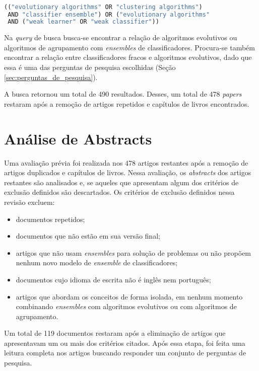 \documentclass[12pt]{report}
\begin{document}
\begin{lstlisting}[language=Python]

(("evolutionary algorithms" OR "clustering algorithms")
 AND "classifier ensemble") OR ("evolutionary algorithms"
 AND ("weak learner" OR "weak classifier"))

\end{lstlisting}

\bigbreak

Na \textit{query} de busca busca-se encontrar a relação de algoritmos evolutivos ou algoritmos de agrupamento com \textit{ensembles} de classificadores. Procura-se também encontrar a relação entre classificadores fracos e algoritmos evolutivos, dado que essa é uma das perguntas de pesquisa escolhidas (Seção \ref{sec:perguntas_de_pesquisa}).

A busca retornou um total de 490 resultados. Desses, um total de 478 \textit{papers} restaram após a remoção de artigos repetidos e capítulos de livros encontrados.  

\section{Análise de Abstracts} \label{sec:analise_de_abstracts}

Uma avaliação prévia foi realizada nos 478 artigos restantes após a remoção de artigos duplicados e capítulos de livros. Nessa avaliação, os \textit{abstracts} dos artigos restantes são analisados e, se aqueles que apresentam algum dos critérios de exclusão definidos são descartados. Os critérios de exclusão definidos nessa revisão excluem:

\begin{itemize}
    \item documentos repetidos;
    \item documentos que não estão em sua versão final;
    \item artigos que não usam \textit{ensembles} para solução de problemas ou não propõem nenhum novo modelo de \textit{ensemble} de classificadores;
    \item documentos cujo idioma de escrita não é inglês nem português;
    \item artigos que abordam os conceitos de forma isolada, em nenhum momento combinando \textit{ensembles} com algoritmos evolutivos ou com algoritmos de agrupamento.
\end{itemize}

Um total de 119 documentos restaram após a eliminação de artigos que apresentavam um ou mais dos critérios citados. Após essa etapa, foi feita uma leitura completa nos artigos buscando responder um conjunto de perguntas de pesquisa.
\end{document}
